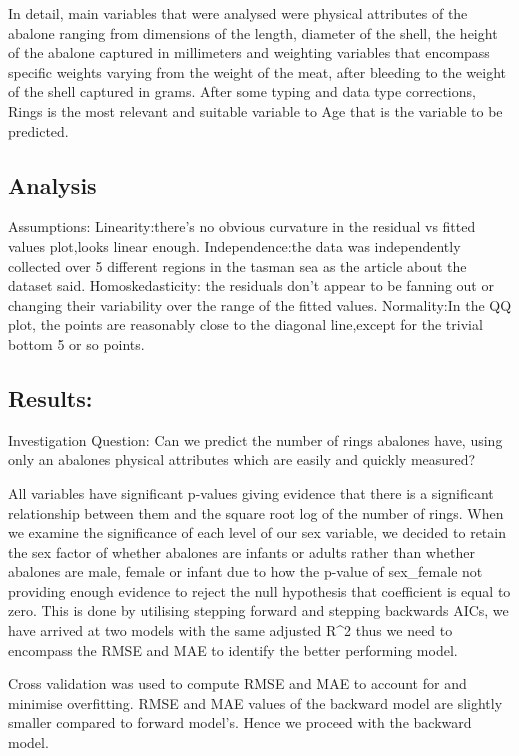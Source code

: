 \documentclass[letterpaper,9pt,twocolumn,twoside,]{pinp}
\begin{document}
In detail, main variables that were analysed were physical attributes of
the abalone ranging from dimensions of the length, diameter of the
shell, the height of the abalone captured in millimeters and weighting
variables that encompass specific weights varying from the weight of the
meat, after bleeding to the weight of the shell captured in grams. After
some typing and data type corrections, Rings is the most relevant and
suitable variable to Age that is the variable to be predicted.

\hypertarget{analysis}{%
\subsection{Analysis}\label{analysis}}

Assumptions: Linearity:there's no obvious curvature in the residual vs
fitted values plot,looks linear enough. Independence:the data was
independently collected over 5 different regions in the tasman sea as
the article about the dataset said. Homoskedasticity: the residuals
don't appear to be fanning out or changing their variability over the
range of the fitted values. Normality:In the QQ plot, the points are
reasonably close to the diagonal line,except for the trivial bottom 5 or
so points.

\hypertarget{results}{%
\subsection{Results:}\label{results}}

Investigation Question: Can we predict the number of rings abalones
have, using only an abalones physical attributes which are easily and
quickly measured?

All variables have significant p-values giving evidence that there is a
significant relationship between them and the square root log of the
number of rings. When we examine the significance of each level of our
sex variable, we decided to retain the sex factor of whether abalones
are infants or adults rather than whether abalones are male, female or
infant due to how the p-value of sex\_female not providing enough
evidence to reject the null hypothesis that coefficient is equal to
zero. This is done by utilising stepping forward and stepping backwards
AICs, we have arrived at two models with the same adjusted R\^{}2 thus
we need to encompass the RMSE and MAE to identify the better performing
model.

Cross validation was used to compute RMSE and MAE to account for and
minimise overfitting. RMSE and MAE values of the backward model are
slightly smaller compared to forward model's. Hence we proceed with the
backward model.
\end{document}
